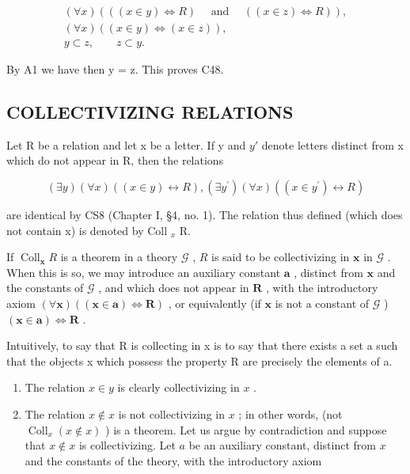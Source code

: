 \[
\begin{array}{c} (\forall x) (((x \in y) \Longleftrightarrow R) \quad \text { and } \quad ((x \in z) \Longleftrightarrow R)), \\ (\forall x) ((x \in y) \Longleftrightarrow (x \in z)), \\ y \subset z, \qquad z \subset y. \end{array}
\]

By A1 we have then y = z. This proves C48.

\subsection{COLLECTIVIZING RELATIONS}

Let R be a relation and let x be a letter. If y and \(y'\) denote letters distinct from x which do not appear in R, then the relations

\[
(\exists y) (\forall x) ((x \in y) \leftrightarrow R), (\exists y ^ {\prime}) (\forall x) ((x \in y ^ {\prime}) \leftrightarrow R)
\]

are identical by CS8 (Chapter I, §4, no. 1). The relation thus defined (which does not contain x) is denoted by Coll \(_{x}\) R.

If \(\operatorname{Coll}_{\mathbf{x}} R\) is a theorem in a theory \(\mathcal{G}\) , \(R\) is said to be collectivizing in \(\mathbf{x}\) in \(\mathcal{G}\) . When this is so, we may introduce an auxiliary constant \(\mathbf{a}\) , distinct from \(\mathbf{x}\) and the constants of \(\mathcal{G}\) , and which does not appear in \(\mathbf{R}\) , with the introductory axiom \((\forall \mathbf{x}) ((\mathbf{x} \in \mathbf{a}) \Longleftrightarrow \mathbf{R})\) , or equivalently (if \(\mathbf{x}\) is not a constant of \(\mathcal{G}\) ) \((\mathbf{x} \in \mathbf{a}) \Longleftrightarrow \mathbf{R}\) .

Intuitively, to say that R is collecting in x is to say that there exists a set a such that the objects x which possess the property R are precisely the elements of a.


\begin{enumerate}
\def\labelenumi{(\arabic{enumi})}
\item
  The relation \(x \in y\) is clearly collectivizing in \(x\) .
\item
  The relation \(x \notin x\) is not collectivizing in \(x\) ; in other words, (not \(\operatorname{Coll}_x(x \notin x)\) ) is a theorem. Let us argue by contradiction and suppose that \(x \notin x\) is collectivizing. Let \(a\) be an auxiliary constant, distinct from \(x\) and the constants of the theory, with the introductory axiom
\end{enumerate}

